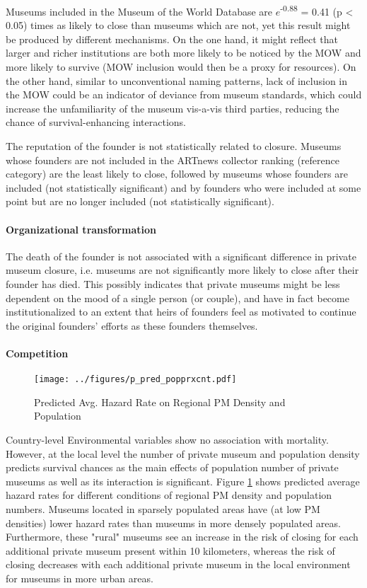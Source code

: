 \documentclass[12pt]{article}
\begin{document}
Museums included in the Museum of the World Database are \(e\)\textsuperscript{-0.88} = 0.41 (p < 0.05) times as likely to close than museums which are not, yet this result might be produced by different mechanisms.
On the one hand, it might reflect that larger and richer institutions are both more likely to be noticed by the MOW and more likely to survive (MOW inclusion would then be a proxy for resources).
On the other hand, similar to unconventional naming patterns, lack of inclusion in the MOW could be an indicator of deviance from museum standards, which could increase the unfamiliarity of the museum vis-a-vis third parties, reducing the chance of survival-enhancing interactions.


The reputation of the founder is not statistically related to closure. 
Museums whose founders are not included in the ARTnews collector ranking (reference category) are the least likely to close, followed by museums whose founders are included (not statistically significant) and by founders who were included at some point but are no longer included (not statistically significant).

\paragraph*{Organizational transformation}


The death of the founder is not associated with a significant difference in private museum closure, i.e. museums are not significantly more likely to close after their founder has died.
This possibly indicates that private museums might be less dependent on the mood of a single person (or couple), and have in fact become institutionalized to an extent that heirs of founders feel as motivated to continue the original founders' efforts as these founders themselves.

\paragraph*{Competition}

\begin{figure}[htbp]
\centering
\texttt{[image: ../figures/p\_pred\_popprxcnt.pdf]}
\caption{\label{fig:p_pred_popprxcnt}Predicted Avg. Hazard Rate on Regional PM Density and Population}
\end{figure}



Country-level Environmental variables show no association with mortality.
However, at the local level the number of private museum and population density predicts survival chances as the main effects of population number of private museums as well as its interaction is significant.
Figure \ref{fig:p_pred_popprxcnt} shows predicted average hazard rates for different conditions of regional PM density and population numbers.
Museums located in sparsely populated areas have (at low PM densities) lower hazard rates than museums in more densely populated areas. 
Furthermore, these "rural" museums see an increase in the risk of closing for each additional private museum present within 10 kilometers, whereas the risk of closing decreases with  each additional private museum in the local environment for museums in more urban areas. 
\end{document}
